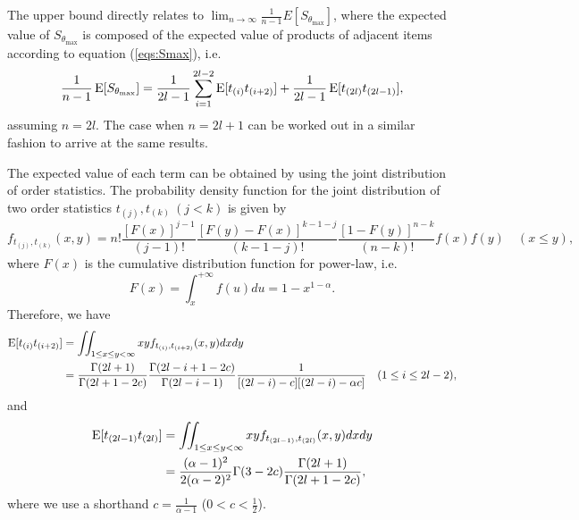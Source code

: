 The upper bound directly relates to $ \lim_{n \rightarrow \infty} \frac{1}{n-1} E[S_{\theta_{\max}}] $, 
where the expected value of $ S_{\theta_{\max}} $ is composed of the expected value of products of adjacent items according to equation (\ref{eqs:Smax}), i.e.
\begin{equation}
	\frac{1}{n-1}\E[S_{\theta_{\max}}] = \frac{1}{2l-1}\sum_{i=1}^{2l-2} \E[t_{(i)} t_{(i+2)}] + \frac{1}{2l-1} \E[t_{(2l)} t_{(2l-1)}], \label{eqs:s-maxmem}
\end{equation}
assuming $ n=2l $. The case when $ n=2l+1 $ can be worked out in a similar fashion to arrive at the same results.

The expected value of each term can be obtained by using the joint distribution of order statistics. 
The probability density function for the joint distribution of two order statistics $ t_{(j)}, t_{(k)}\  (j <k)$ is given by \cite{David2003}
\begin{equation}
	f_{t_{(j)}, t_{(k)}} (x,y) = n! \frac{[F(x)]^{j-1}}{(j-1)!} \frac{[F(y) - F(x)]^{k-1-j}}{(k-1-j)!} \frac{[1-F(y)]^{n-k}}{(n-k)!} f(x) f(y) \quad  (x \leq y),
\end{equation}
where $ F(x) $ is the cumulative distribution function for power-law, i.e.
\begin{equation}
	F(x) = \int_{x}^{+\infty}f(u)du = 1 - x^{1-\alpha}.
\end{equation}
Therefore, we have
\begin{equation}
\begin{split}
	\E[t_{(i)} t_{(i+2)}] &= \iint_{1 \leq x \leq y < \infty} x y f_{t_{(i)}, t_{(i+2)}}(x,y) dx dy \\
	&= \frac{\Gamma(2l+1)}{\Gamma(2l+1-2c)} \frac{\Gamma(2l-i+1-2c)}{\Gamma(2l-i-1)} \frac{1}{[(2l-i) - c][(2l-i) - \alpha c]} \quad (1 \leq i \leq 2l-2),
\end{split}
\end{equation}
and
\begin{equation}
\begin{split}
\E[t_{(2l-1)}t_{(2l)}] &= \iint_{1 \leq x \leq y < \infty} x y f_{t_{(2l-1)}, t_{(2l)}}(x,y) dx dy \\
&= \frac{(\alpha-1)^2}{2(\alpha-2)^2} \Gamma(3-2c) \frac{\Gamma(2l+1)}{\Gamma(2l+1-2c)},
\end{split}
\end{equation}
where we use a shorthand $ c = \frac{1}{\alpha-1}$ ($ 0<c<\frac{1}{2} $).

